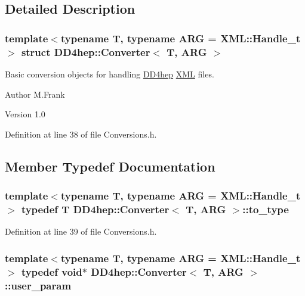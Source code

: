 \subsection{Detailed Description}
\subsubsection*{template$<$typename T, typename ARG = XML::Handle\_\-t$>$ struct DD4hep::Converter$<$ T, ARG $>$}

Basic conversion objects for handling \hyperlink{namespace_d_d4hep}{DD4hep} \hyperlink{namespace_d_d4hep_1_1_x_m_l}{XML} files. \begin{DoxyAuthor}{Author}
M.Frank 
\end{DoxyAuthor}
\begin{DoxyVersion}{Version}
1.0 
\end{DoxyVersion}


Definition at line 38 of file Conversions.h.

\subsection{Member Typedef Documentation}
\hypertarget{struct_d_d4hep_1_1_converter_ab6977053b60eb411fc88ac61e7a47832}{
\subsubsection[{to\_\-type}]{\setlength{\rightskip}{0pt plus 5cm}template$<$typename T, typename ARG = XML::Handle\_\-t$>$ typedef {\bf T} {\bf DD4hep::Converter}$<$ {\bf T}, ARG $>$::{\bf to\_\-type}}}
\label{struct_d_d4hep_1_1_converter_ab6977053b60eb411fc88ac61e7a47832}


Definition at line 39 of file Conversions.h.\hypertarget{struct_d_d4hep_1_1_converter_a13a876ea9cfcadf85a3dadd32e97a834}{
\subsubsection[{user\_\-param}]{\setlength{\rightskip}{0pt plus 5cm}template$<$typename T, typename ARG = XML::Handle\_\-t$>$ typedef void$\ast$ {\bf DD4hep::Converter}$<$ {\bf T}, ARG $>$::{\bf user\_\-param}}}
\label{struct_d_d4hep_1_1_converter_a13a876ea9cfcadf85a3dadd32e97a834}


